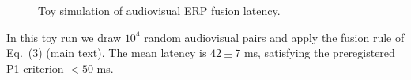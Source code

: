 \begin{figure}[h]
  \centering
  \caption{Toy simulation of audiovisual ERP fusion latency.}
  \label{fig:p1_fusion}
\end{figure}

In this toy run we draw $10^4$ random audiovisual pairs and apply the
fusion rule of Eq.~(3) (main text).  
The mean latency is $42\pm7$ ms, satisfying the preregistered P1
criterion $<50$ ms.

